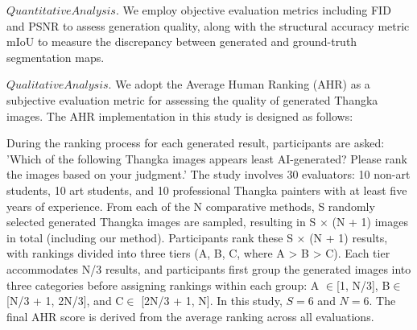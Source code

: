 \documentclass[sn-mathphys]{sn-jnl}%
\theoremstyle{thmstyleone}%
\theoremstyle{thmstyletwo}%
\theoremstyle{thmstylethree}%
\begin{document}
$ Quantitative Analysis. $ We employ objective evaluation metrics including FID \cite{b35} and PSNR \cite{b36} to assess generation quality, along with the structural accuracy metric mIoU \cite{b37} to measure the discrepancy between generated and ground-truth segmentation maps.  

$ Qualitative Analysis. $ We adopt the Average Human Ranking (AHR) \cite{b38} as a subjective evaluation metric for assessing the quality of generated Thangka images. The AHR implementation in this study is designed as follows:  

During the ranking process for each generated result, participants are asked: 'Which of the following Thangka images appears least AI-generated? Please rank the images based on your judgment.' The study involves 30 evaluators: 10 non-art students, 10 art students, and 10 professional Thangka painters with at least five years of experience. From each of the N comparative methods, S randomly selected generated Thangka images are sampled, resulting in S × (N + 1) images in total (including our method). Participants rank these S × (N + 1) results, with rankings divided into three tiers (A, B, C, where A > B > C). Each tier accommodates N/3 results, and participants first group the generated images into three categories before assigning rankings within each group: A $ \in $[1, N/3], B$ \in $[N/3 + 1, 2N/3], and C$ \in $ [2N/3 + 1, N]. In this study, $ S=6 $ and $ N=6 $. The final AHR score is derived from the average ranking across all evaluations.
\end{document}
